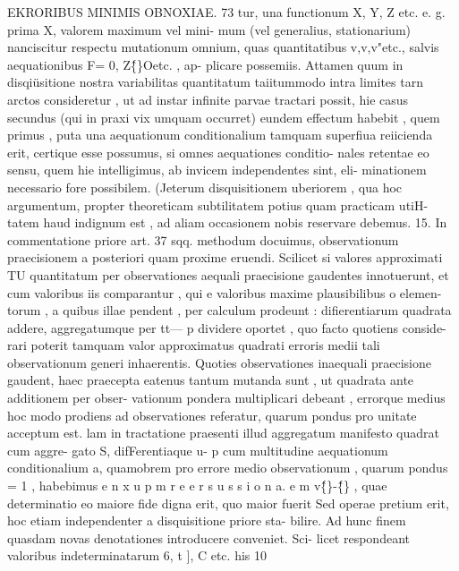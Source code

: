 \documentclass[12pt,a4paper]{article}
\begin{document}
\newpage
EKRORIBUS MINIMIS OBNOXIAE. 73
tur, una functionum X, Y, Z etc. e. g. prima X, valorem maximum vel mini-
mum (vel generalius, stationarium) nanciscitur respectu mutationum omnium,
quas quantitatibus v,v,v"etc., salvis aequationibus F= 0, Z\^\{\}Oetc. , ap-
plicare possemiis. Attamen quum in disqiüsitione nostra variabilitas quantitatum
taiitummodo intra limites tarn arctos consideretur , ut ad instar infinite parvae
tractari possit, hie casus secundus (qui in praxi vix umquam occurret) eundem
effectum habebit , quem primus , puta una aequationum conditionalium tamquam
superfiua reiicienda erit, certique esse possumus, si omnes aequationes conditio-
nales retentae eo sensu, quem hie intelligimus, ab invicem independentes sint, eli-
minationem necessario fore possibilem. (Jeterum disquisitionem uberiorem , qua
hoc argumentum, propter theoreticam subtilitatem potius quam practicam utiH-
tatem haud indignum est , ad aliam occasionem nobis reservare debemus.
15.
In commentatione priore art. 37 sqq. methodum docuimus, observationum
praecisionem a posteriori quam proxime eruendi. Scilicet si valores approximati
TU quantitatum per observationes aequali praecisione gaudentes innotuerunt, et
cum valoribus iis comparantur , qui e valoribus maxime plausibilibus o elemen-
torum , a quibus illae pendent , per calculum prodeunt : difierentiarum quadrata
addere, aggregatumque per tt--- p dividere oportet , quo facto quotiens conside-
rari poterit tamquam valor approximatus quadrati erroris medii tali observationum
generi inhaerentis. Quoties observationes inaequali praecisione gaudent, haec
praecepta eatenus tantum mutanda sunt , ut quadrata ante additionem per obser-
vationum pondera multiplicari debeant , errorque medius hoc modo prodiens ad
observationes referatur, quarum pondus pro unitate acceptum est.
lam in tractatione praesenti illud aggregatum manifesto quadrat cum aggre-
gato S, difFerentiaque u- p cum multitudine aequationum conditionalium a,
quamobrem pro errore medio observationum , quarum pondus = 1 , habebimus
e n x u p m r e e r s u s s i o n a. e m v\^\{\}-\^\{\} , quae determinatio eo maiore fide digna erit, quo maior fuerit
Sed operae pretium erit, hoc etiam independenter a disquisitione priore sta-
bilire. Ad hunc finem quasdam novas denotationes introducere conveniet. Sci-
licet respondeant valoribus indeterminatarum 6, t ], C etc. his
10
\end{document}
